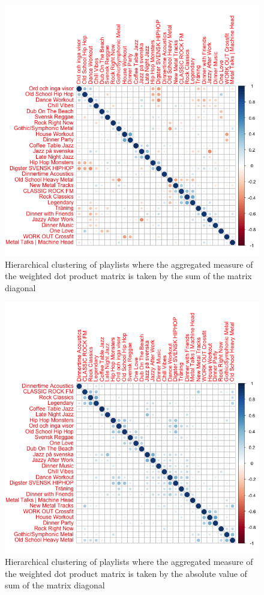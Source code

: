 \documentclass[a4paper,11pt]{kth-mag}
\begin{document}
\begin{figure}
\includegraphics[scale=0.5]{images/sum.png}
\caption{Hierarchical clustering of playlists where the aggregated measure of the weighted dot product matrix is taken by the sum of the matrix diagonal}
\end{figure}

\begin{figure}
\includegraphics[scale=0.5]{images/absSum.png}
\caption{Hierarchical clustering of playlists where the aggregated measure of the weighted dot product matrix is taken by the absolute value of sum of the matrix diagonal}
\end{figure}
\end{document}
